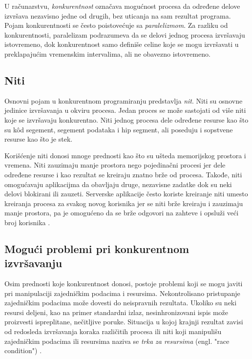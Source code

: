 \documentclass[12pt,oneside]{memoir}
\begin{document}
U računarstvu, \textit{konkurentnost} označava mogućnost procesa da određene delove izvršava nezavisno jedne od drugih, bez uticanja na sam rezultat programa. Pojam konkurentnosti se često poistovećuje sa \textit{paralelizmom}. Za razliku od konkurentnosti, paralelizam podrazumeva da se delovi jednog procesa izvršavaju istovremeno, dok konkurentnost samo definiše celine koje se mogu izvršavati u preklapajućim vremenskim intervalima, ali ne obavezno istovremeno. 

\subsection{Niti}

Osnovni pojam u konkurentnom programiranju predstavlja \textit{nit}. Niti su osnovne jedinice izvršavanja u okviru procesa. Jedan proces se može sastojati od više niti koje se izvršavaju konkurentno. Niti jednog procesa dele određene resurse kao što su k\^{o}d segement, segement podataka i hip segment, ali poseduju i sopstvene resurse kao što je stek. 

Korišćenje niti donosi mnoge prednosti kao što su ušteda memorijskog prostora i vremena. Niti zauzimaju manje prostora nego pojedinačni procesi jer dele određene resurse i kao rezultat se kreiraju znatno brže od procesa. Takođe, niti omogućavaju aplikacijma da obavljaju druge, nezavisne zadatke dok su neki delovi blokirani ili zauzeti. Serverske aplikacije često koriste kreiranje niti umesto kreiranja procesa za svakog novog korisnika jer se niti brže kreiraju i zauzimaju manje prostora, pa je omogućeno da se brže odgovori na zahteve i opsluži veći broj korisnika \cite{os}.  

\subsection{Mogući problemi pri konkurentnom izvršavanju}

Osim prednosti koje konkurentnost donosi, postoje problemi koji se mogu javiti pri manipulaciji zajedničkim podacima i resursima. Nekontrolisano pristupanje zajedničkim podacima može dovesti do neispravnih rezultata. Ukoliko su neki resursi deljeni, kao na primer standardni izlaz, nesinhronizovani ispis može proizvesti ispreplitane, nečitljive poruke. Situacija u kojoj krajnji rezultat zavisi od redosleda izvršavanja koraka različitih procesa ili niti koji manipulišu zajedničkim podacima ili resursima naziva se \textit{trka za resursima} (engl. "race condition") \cite{os}.
\end{document}
